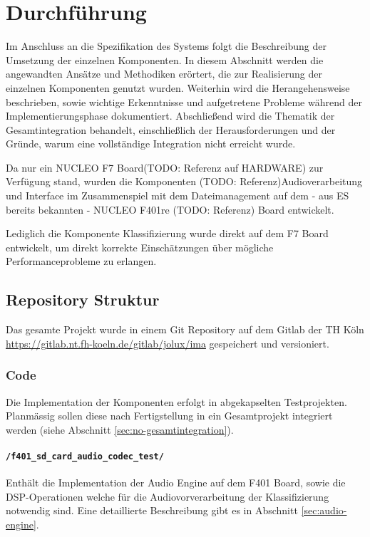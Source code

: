 \newpage
\section{Durchführung}
Im Anschluss an die Spezifikation des Systems folgt die Beschreibung der Umsetzung der einzelnen Komponenten. In diesem Abschnitt werden die angewandten Ansätze und Methodiken erörtert, die zur Realisierung der einzelnen Komponenten genutzt wurden. Weiterhin wird die Herangehensweise beschrieben, sowie wichtige Erkenntnisse und aufgetretene Probleme während der Implementierungsphase dokumentiert. Abschließend wird die Thematik der Gesamtintegration behandelt, einschließlich der Herausforderungen und der Gründe, warum eine vollständige Integration nicht erreicht wurde.

Da nur ein NUCLEO F7 Board(TODO: Referenz auf HARDWARE) zur Verfügung stand, wurden die Komponenten (TODO: Referenz)Audioverarbeitung und Interface im Zusammenspiel mit dem Dateimanagement auf dem - aus ES bereits bekannten - NUCLEO F401re (TODO: Referenz) Board entwickelt.

Lediglich die Komponente Klassifizierung wurde direkt auf dem F7 Board entwickelt, um direkt korrekte Einschätzungen über mögliche Performanceprobleme zu erlangen.

\subsection{Repository Struktur}

Das gesamte Projekt wurde in einem Git Repository auf dem Gitlab der TH Köln \url{https://gitlab.nt.fh-koeln.de/gitlab/jolux/ima} gespeichert und versioniert.

\subsubsection{Code}

Die Implementation der Komponenten erfolgt in abgekapselten Testprojekten. 
Planmässig sollen diese nach Fertigstellung in ein Gesamtprojekt integriert werden (siehe Abschnitt \ref{sec:no-gesamtintegration}).

\paragraph{\texttt{/f401\_sd\_card\_audio\_codec\_test/}}

Enthält die Implementation der Audio Engine auf dem F401 Board, sowie die DSP-Operationen welche für die Audiovorverarbeitung der Klassifizierung notwendig sind. Eine detaillierte Beschreibung gibt es in Abschnitt \ref{sec:audio-engine}.

